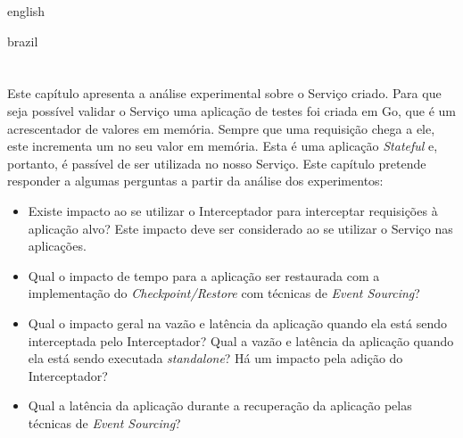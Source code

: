 

\begin{otherlanguage*}{english}


\begin{otherlanguage*}{brazil}

\chapter{} \label{cap:analise:experimental}

Este capítulo apresenta a análise experimental sobre o Serviço criado. Para que seja possível
validar o Serviço uma aplicação de testes foi criada em Go, que é um acrescentador de valores
em memória. Sempre que uma requisição chega a ele, este incrementa um no seu valor em memória.
Esta é uma aplicação \textit{Stateful} e, portanto, é passível de ser utilizada no nosso Serviço.
Este capítulo pretende responder a algumas perguntas a partir da análise dos experimentos:

\begin{itemize}
	\item Existe impacto ao se utilizar o Interceptador para interceptar requisições à
	aplicação alvo? Este impacto deve ser considerado ao se utilizar o Serviço nas
	aplicações.
	\item Qual o impacto de tempo para a aplicação ser restaurada com a implementação do
	\textit{Checkpoint/Restore} com técnicas de \textit{Event Sourcing}?
	\item Qual o impacto geral na vazão e latência da aplicação quando ela está sendo
	interceptada pelo Interceptador? Qual a vazão e latência da aplicação quando ela
	está sendo executada \textit{standalone}? Há um impacto pela adição do Interceptador?
	\item Qual a latência da aplicação durante a recuperação da aplicação pelas técnicas de
	\textit{Event Sourcing}?
\end{itemize}


\end{otherlanguage*}
\end{otherlanguage*}

